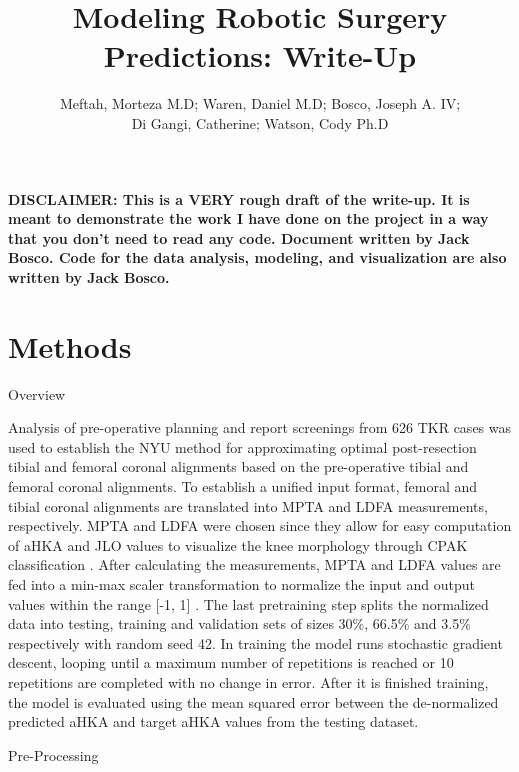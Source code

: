\documentclass{article}
\author{Meftah, Morteza M.D; Waren, Daniel M.D; Bosco, Joseph A. IV;\\
Di Gangi, Catherine; Watson, Cody Ph.D}
\title{Modeling Robotic Surgery Predictions: Write-Up}
\begin{document}

\newcommand\epochs{86}
\newcommand\batchsize{4}
\newcommand\convergence{6}
\newcommand\mse{1.819}
\newcommand\ns{0.587}

\maketitle

\textbf{%
DISCLAIMER:
This is a VERY rough draft of the write-up. 
It is meant to demonstrate the work I have done on the project in a way that you don't need to read any code.
Document written by Jack Bosco. 
Code for the data analysis, modeling, and visualization are also written by Jack Bosco. 
}

\section{Methods}

Overview

	Analysis of pre-operative planning and report screenings from 626 TKR cases
was used to establish the NYU method for approximating optimal post-resection tibial
and femoral coronal alignments based on the pre-operative tibial and femoral coronal alignments.
To establish a unified input format, femoral and tibial coronal alignments are translated into MPTA and LDFA measurements, respectively.
MPTA and LDFA were chosen since they allow for easy computation of aHKA and JLO values to visualize the knee morphology through CPAK classification \cite{cpak-paper}.
After calculating the measurements, MPTA and LDFA values are fed into a min-max scaler transformation to normalize the input and output values within the range [-1, 1] \cite{mm-norm}.
The last pretraining step splits the normalized data into testing, training and validation sets of sizes 30\%, 66.5\% and 3.5\% respectively with random seed 42.
In training the model runs stochastic gradient descent, looping until a maximum number of repetitions is reached or 10 repetitions are completed with no change in error.
After it is finished training, the model is evaluated using the mean squared error between the de-normalized predicted aHKA and target aHKA values from the testing dataset.

Pre-Processing
\end{document}
